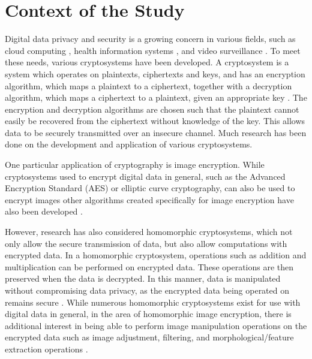 
\section{Context of the Study}

Digital data privacy and security is a growing concern in various fields, such as cloud computing \cite{potey_homomorphic_2016}, health information systems \cite{kester_cryptographic_2015}, and video surveillance \cite{upmanyu_efficient_2009}. To meet these needs, various cryptosystems have been developed. A cryptosystem is a system which operates on plaintexts, ciphertexts and keys, and has an encryption algorithm, which maps a plaintext to a ciphertext, together with a decryption algorithm, which maps a ciphertext to a plaintext, given an appropriate key \cite{bauer_cryptosystem_2005}. The encryption and decryption algorithms are chosen such that the plaintext cannot easily be recovered from the ciphertext without knowledge of the key. This allows data to be securely transmitted over an insecure channel. Much research has been done on the development and application of various cryptosystems.

One particular application of cryptography is image encryption. While cryptosystems used to encrypt digital data in general, such as the Advanced Encryption Standard (AES) or elliptic curve cryptography, can also be used to encrypt images \cite{jain_image_2016, singh_image_2015} other algorithms created specifically for image encryption have also been developed \cite{murugan_survey_2018}.

However, research has also considered homomorphic cryptosystems, which not only allow the secure transmission of data, but also allow computations with encrypted data. In a homomorphic cryptosystem, operations such as addition and multiplication can be performed on encrypted data. These operations are then preserved when the data is decrypted. In this manner, data is manipulated without compromising data privacy, as the encrypted data being operated on remains secure \cite{fontaine_survey_2007, sen_homomorphic_2013}. While numerous homomorphic cryptosystems exist for use with digital data in general, in the area of homomorphic image encryption, there is additional interest in being able to perform image manipulation operations on the encrypted data such as image adjustment, filtering, and morphological/feature extraction operations \cite{ziad_cryptoimg:_2016, gonzalez_digital_2008}.
